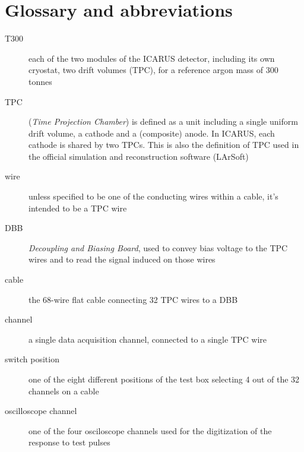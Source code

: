 \section{Glossary and abbreviations}
\label{sec:glossary}

\begin{description}
  \item[T300] each of the two modules of the ICARUS detector, including its own cryostat, two drift volumes (TPC), for a reference argon mass of 300 tonnes
  \item[TPC] (\emph{Time Projection Chamber}) is defined as a unit including a single uniform drift volume, a cathode and a (composite) anode. In ICARUS, each cathode is shared by two TPCs. This is also the definition of TPC used in the official simulation and reconstruction software (LArSoft)
  \item[wire] unless specified to be one of the conducting wires within a cable, it's intended to be a TPC wire
  \item[DBB] \emph{Decoupling and Biasing Board}, used to convey bias voltage to the TPC wires and to read the signal induced on those wires
  \item[cable] the 68-wire flat cable connecting 32 TPC wires to a DBB
  \item[channel] a single data acquisition channel, connected to a single TPC wire
  \item[switch position] one of the eight different positions of the test box selecting 4 out of the 32 channels on a cable
  \item[oscilloscope channel] one of the four osciloscope channels used for the digitization of the response to test pulses
\end{description}
